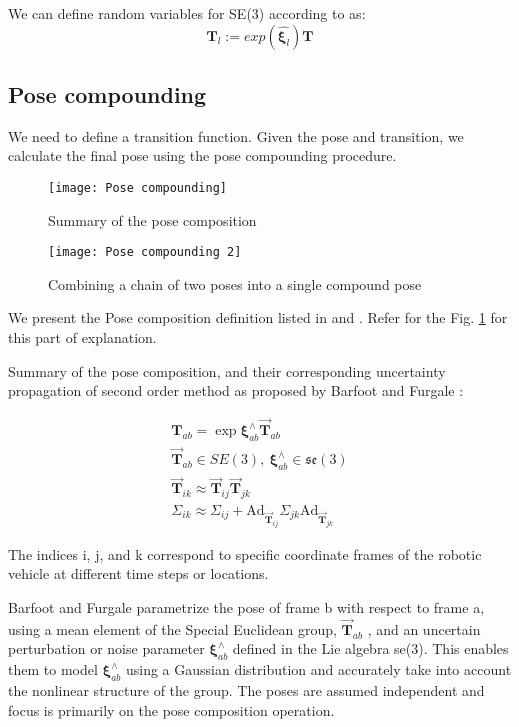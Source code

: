 \documentclass{article}
\begin{document}
We can define random variables for SE(3) according to \cite{Mangelson} as:
\begin{equation}
	\mathbf{T}_l:= exp(\hat{\mathbf{\xi}_l}) {\mathbf{T}}
\end{equation}


\subsection{Pose compounding}\label{sec:pose_comp}

We need to define a transition function. Given the pose and transition, we calculate the final pose using the pose compounding procedure.

\begin{figure}
	\texttt{[image: Pose compounding]}
	
	\caption{Summary of the pose composition \cite{Mangelson}}
	\label{fig:Pose-comp}
\end{figure}

\begin{figure}
	\texttt{[image: Pose compounding 2]}
	\caption{Combining a chain of two poses into a single compound pose\cite{Barfoot}}
	\label{fig:Pose-comp-2}
\end{figure}

We present the Pose composition definition listed in \cite{Mangelson} and \cite{Barfoot}. Refer for the Fig. \ref{fig:Pose-comp} for this part of explanation.

Summary of the pose composition, and their corresponding uncertainty propagation of second order method as proposed by
Barfoot and Furgale \cite{Barfoot}:

\begin{align}
	\mathbf{T}_{ab} = \exp{\mathbf{\xi}_{ab}^{\wedge}}\vec{\mathbf{T}}_{ab} \\
	\vec{\mathbf{T}}_{ab} \in SE(3), \
	\mathbf{\xi}_{ab}^{\wedge} \in \mathfrak{se}(3) \\
	\vec{\mathbf{T}}_{ik} \approx \vec{\mathbf{T}}_{ij}\vec{\mathbf{T}}_{jk} \\
	\Sigma_{ik} \approx \Sigma_{ij} + \mathrm{Ad}_{\vec{\mathbf{T}}_{ij}} \Sigma_{jk} \mathrm{Ad}_{\vec{\mathbf{T}}_{jk}}
\end{align}

The indices i, j, and k correspond to specific coordinate frames of the robotic vehicle at different time
steps or locations.

Barfoot and Furgale \cite{Barfoot}  parametrize the pose of frame b with
respect to frame a, using a mean element of the Special Euclidean group, $\vec{\mathbf{T}}_{ab}$ , and an uncertain perturbation or noise parameter $\mathbf{\xi}_{ab}^{\wedge}$ defined in the Lie algebra
se(3). This enables them to model $\mathbf{\xi}_{ab}^{\wedge}$ using a Gaussian distribution and accurately take into account the nonlinear structure of the group. The poses are assumed independent and focus is primarily on the pose composition operation.
\end{document}

